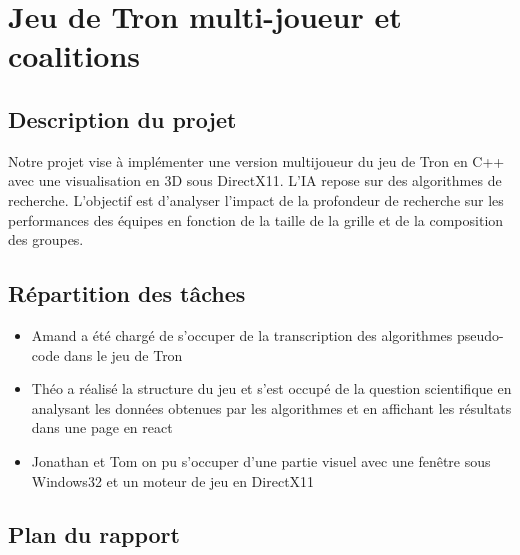 \section{Jeu de Tron multi-joueur et coalitions}
\subsection{Description du projet}
Notre projet vise à implémenter une version multijoueur du jeu de Tron en C++ avec une visualisation en 3D sous DirectX11. L'IA repose sur des algorithmes de recherche. L'objectif est d'analyser l'impact de la profondeur de recherche sur les performances des équipes en fonction de la taille de la grille et de la composition des groupes.

\subsection{Répartition des tâches}
\begin{itemize}
    \item Amand a été chargé de s'occuper de la transcription des algorithmes pseudo-code dans le jeu de Tron
    \item Théo a réalisé la structure du jeu et s'est occupé de la question scientifique en analysant les données obtenues par les algorithmes et en affichant les résultats dans une page en react
    \item Jonathan et Tom on pu s'occuper d'une partie visuel avec une fenêtre sous Windows32 et un moteur de jeu en DirectX11
\end{itemize}

\subsection{Plan du rapport}
\tableofcontents
